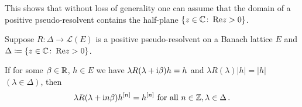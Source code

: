 This shows that without loss of generality one can assume that the domain of a positive pseudo-resolvent contains the half-plane $\{z \in \mathbb{C}  \colon \mathop{}\!\mathrm{Re}  z > 0\}$.
\begin{proposition}\label{prop:c3-2.7}
	Suppose $R \colon \Delta \to \mathcal{L}(E)$ is a positive pseudo-resolvent on a Banach lattice $E$ and $\Delta \coloneqq \{z \in \mathbb{C}  \colon \mathop{}\!\mathrm{Re}  z > 0\}$.
	
	If for some $\beta \in \mathbb{R} $, $h \in E$ we have
	$\lambda R(\lambda+\mathrm{i}\beta)h = h$ and $\lambda R(\lambda)|h| = |h|$ $(\lambda \in \Delta)$, then
	\[
    \lambda R(\lambda+\mathrm{i} n\beta)h^{[n]} = h^{[n]} \text{ for all } n \in \mathbb{Z}, \lambda \in \Delta\,.
    \]
\end{proposition}
